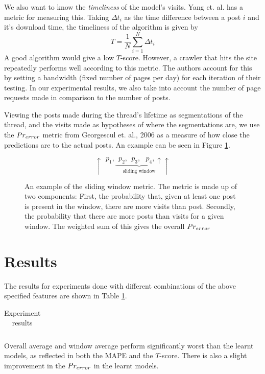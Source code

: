 \documentclass[12 pt]{article}
\begin{document}
We also want to know the \emph{timeliness} of the model's visits. Yang et. al. \cite{Yang2009} has a metric for measuring this. Taking $\Delta t_i$ as the time difference between a post $i$ and it's download time, the timeliness of the algorithm is given by
\[T = \frac{1}{N} \sum^{N}_{i=1}\Delta t_i\]
A good algorithm would give a low $T$-score. However, a crawler that hits the site repeatedly performs well according to this metric. The authors account for this by setting a bandwidth (fixed number of pages per day) for each iteration of their testing. In our experimental results, we also take into account the number of page requests made in comparison to the number of posts. %

Viewing the posts made during the thread's lifetime as segmentations of the thread, and the visits made as hypotheses of where the segmentations are, we use the $Pr_{error}$ metric from Georgescul et. al., 2006 as a measure of how close the predictions are to the actual posts. An example can be seen in Figure \ref{prerror}.


\begin{figure}
\[
	\uparrow~~p_1,\underbrace{~~p_2,~~p_3,~~~p_4,\uparrow}_{\text{sliding window}}\uparrow
\]
\caption{An example of the sliding window metric. The metric is made up of two components: First, the probability that, given at least one post is present in the window, there are more visits than post. Secondly, the probability that there are more posts than visits for a given window. The weighted sum of this gives the overall $Pr_{error}$}\label{prerror}
\end{figure}

\section{Results}

The results for experiments done with different combinations of the above specified features are shown in Table \ref{expt1}.
\begin{table}
	\footnotesize
	\begin{centering}
	\begin{tabular}{|l|c|c|c|c|c|c|c|c|}
	\hline
	
	\hline
	\end{tabular}
	\caption{Experiment results}
	\label{expt1}
\end{centering}
\end{table}

Overall average and window average perform significantly worst than the learnt models, as reflected in both the MAPE and the $T$-score. There is also a slight improvement in the  $Pr_{error}$ in the learnt models.
\end{document}
